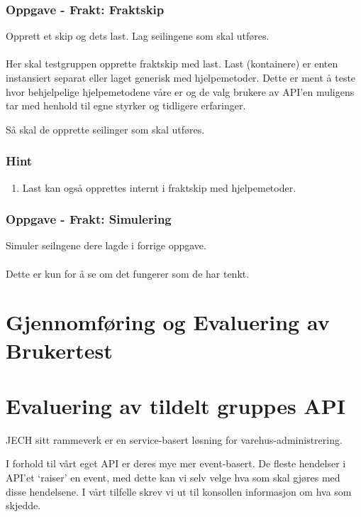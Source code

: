 \documentclass[12pt]{article}
\begin{document}
\newpage
\subsubsection{Oppgave - Frakt: Fraktskip}

Opprett et skip og dets last. Lag seilingene som skal utføres. \\ \\
Her skal testgruppen opprette fraktskip med last. Last (kontainere) er enten instansiert separat eller 
laget generisk med hjelpemetoder. Dette er ment å teste hvor behjelpelige hjelpemetodene våre er og 
de valg brukere av API'en muligens tar med henhold til egne styrker og tidligere erfaringer.

Så skal de opprette seilinger som skal utføres. 

\subsubsection*{Hint}

\begin{enumerate}
    \item Last kan også opprettes internt i fraktskip med hjelpemetoder.
\end{enumerate}

\subsubsection{Oppgave - Frakt: Simulering}

Simuler seilngene dere lagde i forrige oppgave. \\ \\
Dette er kun for å se om det fungerer som de har tenkt.

\section{Gjennomføring og Evaluering av Brukertest}



\section{Evaluering av tildelt gruppes API}

JECH sitt rammeverk er en service-basert løsning for varehus-administrering.

I forhold til vårt eget API er deres mye mer event-basert. De fleste hendelser i API'et
`raiser' en event, med dette kan vi selv velge hva som skal gjøres med disse hendelsene. I vårt tilfelle 
skrev vi ut til konsollen informasjon om hva som skjedde.
\end{document}
